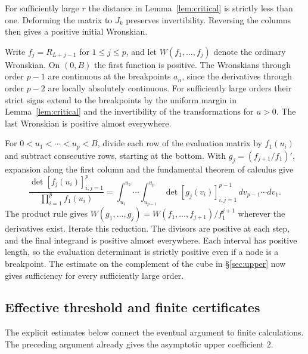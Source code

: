 \documentclass[11pt,a4paper,reqno]{amsart}
\numberwithin{equation}{section}
\begin{document}
For sufficiently large \(r\) the distance in Lemma~\ref{lem:critical} is strictly less than one. Deforming the matrix to \(J_k\) preserves invertibility. Reversing the columns then gives a positive initial Wronskian.

Write \(f_j=R_{L+j-1}\) for \(1\le j\le p\), and let \(W(f_1,\ldots,f_j)\) denote the ordinary Wronskian. On \((0,B)\) the first function is positive. The Wronskians through order \(p-1\) are continuous at the breakpoints \(a_n\), since the derivatives through order \(p-2\) are locally absolutely continuous. For sufficiently large orders their strict signs extend to the breakpoints by the uniform margin in Lemma~\ref{lem:critical} and the invertibility of the transformations for \(u>0\). The last Wronskian is positive almost everywhere.

For \(0<u_1<\cdots<u_p<B\), divide each row of the evaluation matrix by \(f_1(u_i)\) and subtract consecutive rows, starting at the bottom. With \(g_j=(f_{j+1}/f_1)'\), expansion along the first column and the fundamental theorem of calculus give
\[
\frac{\det[f_j(u_i)]_{i,j=1}^p}{\prod_{i=1}^p f_1(u_i)}
 =\int_{u_1}^{u_2}\!\cdots\!\int_{u_{p-1}}^{u_p}
      \det[g_j(v_i)]_{i,j=1}^{p-1}\,dv_{p-1}\cdots dv_1 .
\]
The product rule gives \(W(g_1,\ldots,g_j)=W(f_1,\ldots,f_{j+1})/f_1^{j+1}\) wherever the derivatives exist. Iterate this reduction. The divisors are positive at each step, and the final integrand is positive almost everywhere. Each interval has positive length, so the evaluation determinant is strictly positive even if a node is a breakpoint. The estimate on the complement of the cube in \S\ref{sec:upper} now gives sufficiency for every sufficiently large order.

\subsection{Effective threshold and finite certificates}\label{sec:finite}


The explicit estimates below connect the eventual argument to finite calculations. The preceding argument already gives the asymptotic upper coefficient \(2\).
\end{document}
